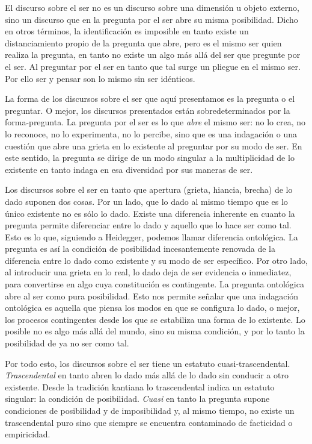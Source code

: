 El discurso sobre el ser no es un discurso sobre una dimensión u objeto externo, sino un discurso que en la pregunta por el ser abre su misma posibilidad. Dicho en otros términos, la identificación es imposible en tanto existe un distanciamiento propio de la pregunta que abre, pero es el mismo ser quien realiza la pregunta, en tanto no existe un algo más allá del ser que pregunte por el ser. Al preguntar por el ser en tanto que tal surge un pliegue en el mismo ser. Por ello ser y pensar son lo mismo sin ser idénticos.

La forma de los discursos sobre el ser que aquí presentamos es la pregunta o el preguntar. O mejor, los discursos presentados están sobredeterminados por la forma-pregunta. La pregunta por el ser es lo que \emph{abre} el mismo ser: no lo crea, no lo reconoce, no lo experimenta, no lo percibe, sino que es una indagación o una cuestión que abre una grieta en lo existente al preguntar por su modo de ser. En este sentido, la pregunta se dirige de un modo singular a la multiplicidad de lo existente en tanto indaga en esa diversidad por sus maneras de ser.

Los discursos sobre el ser en tanto que apertura (grieta, hiancia, brecha) de lo dado suponen dos cosas. Por un lado, que lo dado al mismo tiempo que es lo único existente no es sólo lo dado. Existe una diferencia inherente en cuanto la pregunta permite diferenciar entre lo dado y aquello que lo hace ser como tal. Esto es lo que, siguiendo a Heidegger, podemos llamar diferencia ontológica. La pregunta es así la condición de posibilidad incesantemente renovada de la diferencia entre lo dado como existente y su modo de ser específico. Por otro lado, al introducir una grieta en lo real, lo dado deja de ser evidencia o inmediatez, para convertirse en algo cuya constitución es contingente. La pregunta ontológica abre al ser como pura posibilidad. Esto nos permite señalar que una indagación ontológica es aquella que piensa los modos en que se configura lo dado, o mejor, los procesos contingentes desde los que se estabiliza una forma de lo existente. Lo posible no es algo más allá del mundo, sino su misma condición, y por lo tanto la posibilidad de ya no ser como tal.

Por todo esto, los discursos sobre el ser  tiene un estatuto cuasi-trascendental. \emph{Trascendental} en tanto abren lo dado más allá de lo dado sin conducir a otro existente. Desde la tradición kantiana lo trascendental indica un estatuto singular: la condición de posibilidad. \emph{Cuasi} en tanto la pregunta supone condiciones de posibilidad y de imposibilidad y, al mismo tiempo, no existe un trascendental puro sino que siempre se encuentra contaminado de facticidad o empiricidad.

